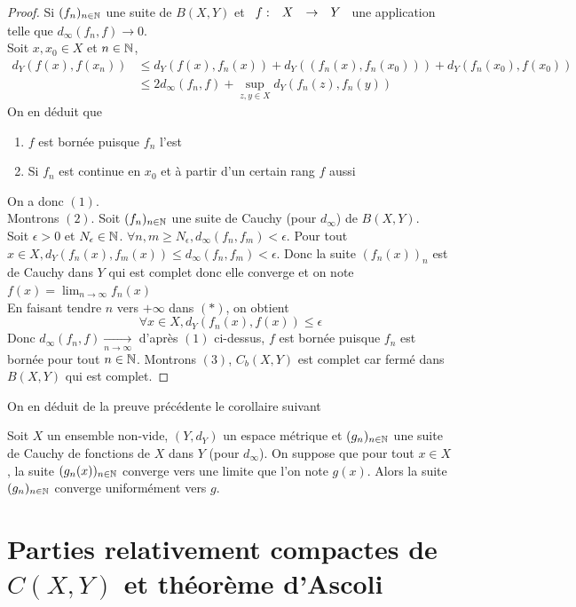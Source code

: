 \documentclass[]{report}
\begin{document}
    \begin{proof}
        Si $(f_n)_{n\in\mathbb{N}}$ une suite de $B(X,Y)$ et $\begin{array}{ccccc} f : & X & \to & Y \end{array}$ une application telle que $d_\infty(f_n,f)\to0$.\\
        Soit $x,x_0\in X$ et ${n\in\mathbb{N}}$,
        \begin{align*}
            d_Y(f(x),f(x_n))&\le d_Y(f(x),f_n(x))+d_Y((f_n(x),f_n(x_0)))+d_Y(f_n(x_0),f(x_0))\\
            &\le 2 d_\infty (f_n,f)+\sup_{z,y\in X}d_Y(f_n(z),f_n(y))
        \end{align*}
        On en déduit que
        \begin{enumerate}
            \item $f$ est bornée puisque $f_n$ l'est
            \item Si $f_n$ est continue en $x_0$ et à partir d'un certain rang $f$ aussi
        \end{enumerate}
        On a donc $(1)$.\\
        Montrons $(2)$. Soit $(f_n)_{{n\in\mathbb{N}}}$ une suite de Cauchy (pour $d_\infty$) de $B(X,Y)$.\\
        Soit $\epsilon>0$ et $N_\epsilon \in \mathbb{N}$. $\forall n,m\ge N_{\epsilon},d_\infty(f_n,f_m)< \epsilon$.
        Pour tout $x\in X, d_Y(f_n(x),f_m(x))\le d_\infty (f_n,f_m)<\epsilon$. Donc la suite $(f_n(x))_n$ est de Cauchy dans $Y$ qui est complet donc elle converge et on note $f(x)=\lim_{n\to \infty}f_n(x)$\\
        En faisant tendre $n$ vers $+\infty$ dans $(*)$, on obtient
        \[\forall x\in X, d_Y(f_n(x),f(x))\le \epsilon\]
        Donc $d_\infty(f_n,f)\underset{n\to \infty}{\longrightarrow}$ d'après $(1)$ ci-dessus, $f$ est bornée puisque $f_n$ est bornée pour tout ${n\in\mathbb{N}}$.
        Montrons $(3)$, $C_b(X,Y)$ est complet car fermé dans $B(X,Y)$ qui est complet. 
    \end{proof}

    On en déduit de la preuve précédente le corollaire suivant

    \begin{cor}{}{}
        Soit $X$ un ensemble non-vide, $(Y,d_Y)$ un espace métrique et $(g_n)_{n\in\mathbb{N}}$ une suite de Cauchy de fonctions de $X$ dans $Y$ (pour $d_\infty$). On suppose que pour tout $x\in X$, la suite $(g_n(x))_{n\in\mathbb{N}}$ converge vers une limite que l'on note $g(x)$. Alors la suite $(g_n)_{n\in\mathbb{N}}$ converge uniformément vers $g$.\\
    \end{cor}

    \section{Parties relativement compactes de $C(X,Y)$ et théorème d'Ascoli}
\end{document}
